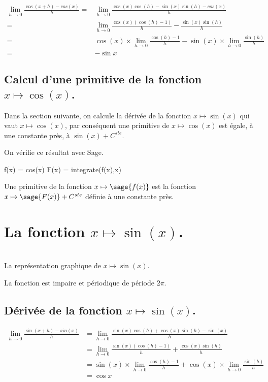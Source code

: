 \documentclass[a4paper,12pt]{report}
\begin{document}
\begin{align*}
\lim_{h\to 0} \frac{\cos(x+h)-cos(x)}{h} = &\lim_{h\to 0} \frac{\cos(x)\cos(h)-\sin(x)\sin(h)-cos(x)}{h} \\ =& \lim_{h\to 0} \frac{\cos(x)(\cos(h)-1)}{h}-\frac{\sin(x)\sin(h)}{h}\\  =&  \cos(x) \times \lim_{h\to 0}\frac{\cos(h)-1}{h}- \sin(x) \times \lim_{h\to 0} \frac{\sin(h)}{h}\\  =& -\sin{x}
\end{align*}

\subsection{Calcul d'une primitive de la fonction  $x \mapsto \cos(x)$.}

Dans la section suivante, on calcule la dérivée de la fonction $x \mapsto \sin(x)$ qui vaut $x \mapsto \cos(x)$, par conséquent une primitive de $x \mapsto \cos(x)$ est égale, à une constante près, à $  \sin(x) + C^{ste} $.

On vérifie ce résultat avec Sage.

\begin{sageblock}
    f(x) = cos(x)
    F(x) = integrate(f(x),x)
\end{sageblock}

Une primitive de la fonction $x \mapsto \sage{f(x)}$  est la fonction $x \mapsto \sage{F(x)} + C^{ste} $ définie à une constante près.


\section{La fonction  $x \mapsto \sin(x)$.}
\begin{center}
 \\
La représentation graphique de $x\mapsto \sin(x)$.
\end{center}
La fonction est impaire et périodique de période $2 \pi$.

\subsection{Dérivée de la fonction $x \mapsto \sin(x)$.}

\begin{align*}
\lim_{h\to 0} \frac{\sin(x+h)-sin(x)}{h} & = \lim_{h\to 0} \frac{\sin(x)\cos(h)+\cos(x)\sin(h)-\sin(x)}{h} \\  & =  \lim_{h\to 0} \frac{\sin(x)(\cos(h)-1)}{h}+\frac{\cos(x)\sin(h)}{h} \\ & = \sin(x) \times  \lim_{h\to 0} \frac{\cos(h)-1}{h}+\cos(x) \times  \lim_{h\to 0}  \frac{\sin(h)}{h} \\ & = \cos{x}
\end{align*}
\end{document}
